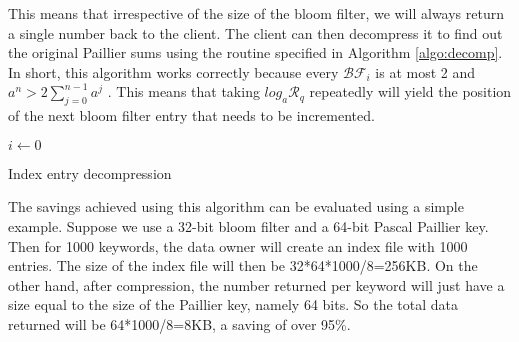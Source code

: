 This means that irrespective of the size
of the bloom filter,
we will always return a single number back to the client. The client can then
decompress it to find out the original Paillier sums using the routine
specified in Algorithm \ref{algo:decomp}. In short, this algorithm works correctly because every
$\mathcal{BF}_i$ is at most 2 and $ {a}^{n} > 2\sum_{j=0}^{n-1} {a}^{j}$ . This means
that taking $log_{a} \mathcal{R}_q$ repeatedly will yield the position of the next
bloom filter entry that needs to be incremented.

\begin{algorithm}
 $i \gets 0 $\;
\;
 \caption{Index entry decompression}
  \vspace{-3px}

 \label{algo:decomp}
\end{algorithm}


The savings achieved using this algorithm can be evaluated using a simple example.
Suppose we use a 32-bit bloom filter and a 64-bit Pascal Paillier key.
Then for 1000 keywords, the data owner will create an index file with 1000 entries.
The size of the index file will then be 32*64*1000/8=256KB. On the other hand,
after compression, the number returned per keyword will just have a size equal to the
size of the Paillier key, namely 64 bits. So the total data returned will be 
64*1000/8=8KB, a saving of over 95\%.
